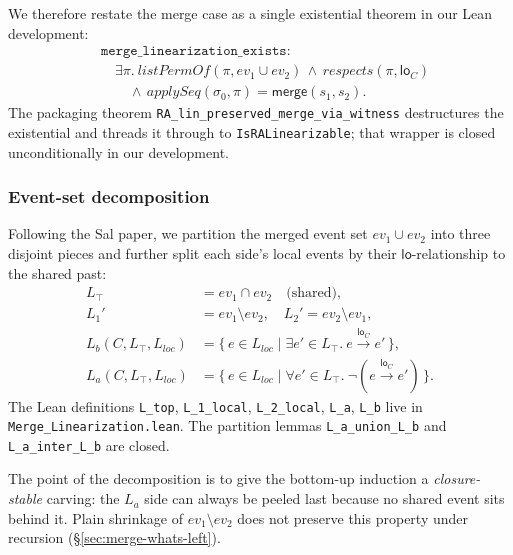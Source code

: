 \documentclass[11pt,a4paper]{article}
\theoremstyle{definition}
\theoremstyle{remark}
\newcommand{\mmerge}{\mathsf{merge}}
\newcommand{\mlo}{\mathsf{lo}}
\newcommand{\ev}{\mathit{ev}}
\newcommand{\init}{\sigma_0}
\begin{document}
We therefore restate the merge case as a single existential
theorem in our Lean development:
\begin{equation}
\label{eq:merge-exists}
\begin{aligned}
&\texttt{merge\_linearization\_exists}: \\
&\quad \exists \pi.\
\mathit{listPermOf}(\pi, \ev_1 \cup \ev_2)
\,\wedge\, \mathit{respects}(\pi, \mlo_C) \\
&\qquad \wedge\, \mathit{applySeq}(\init, \pi) = \mmerge(s_1, s_2).
\end{aligned}
\end{equation}
The packaging theorem
\texttt{RA\_lin\_preserved\_merge\_via\_witness} destructures the
existential and threads it through to
\texttt{IsRALinearizable}; that wrapper is closed unconditionally
in our development.

\subsubsection{Event-set decomposition}
\label{sec:merge-decomposition}

Following the Sal paper, we partition the merged event set
$\ev_1 \cup \ev_2$ into three disjoint pieces and further split
each side's local events by their $\mlo$-relationship to the
shared past:
\begin{align*}
  L_\top   &= \ev_1 \cap \ev_2  \quad\text{(shared)},\\
  L_1'     &= \ev_1 \setminus \ev_2,\quad
  L_2'     = \ev_2 \setminus \ev_1, \\
  L_b(C, L_\top, L_\mathit{loc}) &= \{\, e \in L_\mathit{loc} \mid
    \exists e' \in L_\top.\ e \mathrel{\xrightarrow{\mlo_C}} e' \,\}, \\
  L_a(C, L_\top, L_\mathit{loc}) &= \{\, e \in L_\mathit{loc} \mid
    \forall e' \in L_\top.\ \neg(e \mathrel{\xrightarrow{\mlo_C}} e') \,\}.
\end{align*}
The Lean definitions \texttt{L\_top}, \texttt{L\_1\_local},
\texttt{L\_2\_local}, \texttt{L\_a}, \texttt{L\_b} live in
\texttt{Merge\_Linearization.lean}. The partition lemmas
\texttt{L\_a\_union\_L\_b} and \texttt{L\_a\_inter\_L\_b} are closed.

The point of the decomposition is to give the bottom-up induction a
\emph{closure-stable} carving: the $L_a$ side can always be peeled
last because no shared event sits behind it. Plain shrinkage of
$\ev_1 \setminus \ev_2$ does not preserve this property under
recursion (\S\ref{sec:merge-whats-left}).
\end{document}
